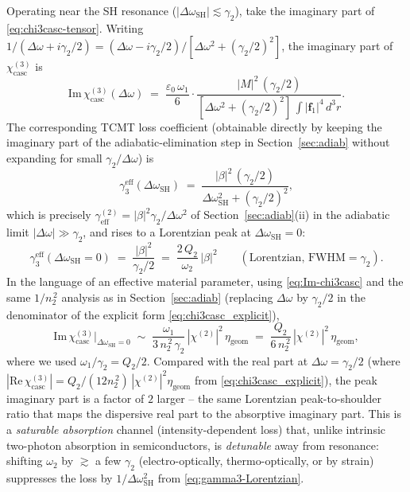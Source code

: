 \documentclass[11pt,a4paper]{article}
\newcommand{\eps}{\varepsilon}
\newcommand{\bvec}[1]{\mathbf{#1}}
\newcommand{\f}{\bvec{f}}
\newcommand{\dthreer}{\,d^{3}r}
\newcommand{\chitwo}{\chi^{(2)}}
\newcommand{\chithree}{\chi^{(3)}}
\newcommand{\Dom}{\Delta\omega}
\begin{document}
Operating near the SH resonance ($|\Dom_\text{SH}|\lesssim\gamma_2$),
take the imaginary part of \eqref{eq:chi3casc-tensor}.  Writing
$1/(\Dom+i\gamma_2/2)=(\Dom-i\gamma_2/2)/[\Dom^{2}+(\gamma_2/2)^{2}]$,
the imaginary part of $\chithree_\text{casc}$ is
\begin{equation}
  \mathrm{Im}\,\chithree_\text{casc}(\Dom)
   \;=\;\frac{\eps_0\,\omega_1}{6}\cdot
        \frac{|M|^{2}\,(\gamma_2/2)}{[\Dom^{2}+(\gamma_2/2)^{2}]\,\int|\f_1|^{4}\dthreer}.
  \label{eq:Im-chi3casc}
\end{equation}
The corresponding TCMT loss coefficient (obtainable directly by
keeping the imaginary part of the adiabatic-elimination step in
Section~\ref{sec:adiab} without expanding for small $\gamma_2/\Dom$)
is
\begin{equation}
  \gamma_3^\text{eff}(\Dom_\text{SH})
   \;=\;\frac{|\beta|^{2}\,(\gamma_2/2)}{\Dom_\text{SH}^{2}+(\gamma_2/2)^{2}},
  \label{eq:gamma3-Lorentzian}
\end{equation}
which is precisely $\gamma_\text{eff}^{(2)}=|\beta|^{2}\gamma_2/\Dom^{2}$
of Section~\ref{sec:adiab}(ii) in the adiabatic limit $|\Dom|\gg\gamma_2$,
and rises to a Lorentzian peak at $\Dom_\text{SH}=0$:
\begin{equation}
  \gamma_3^\text{eff}(\Dom_\text{SH}=0)\;=\;\frac{|\beta|^{2}}{\gamma_2/2}
  \;=\;\frac{2\,Q_2}{\omega_2}\,|\beta|^{2}
  \qquad(\text{Lorentzian, FWHM}=\gamma_2).
  \label{eq:gamma3-peak}
\end{equation}
In the language of an effective material parameter, using
\eqref{eq:Im-chi3casc} and the same $1/n_2^{\,2}$ analysis as in
Section~\ref{sec:adiab} (replacing $\Dom$ by $\gamma_2/2$ in the
denominator of the explicit form \eqref{eq:chi3casc_explicit}),
\begin{equation}
  \mathrm{Im}\,\chithree_\text{casc}\big|_{\Dom_\text{SH}=0}
       \;\sim\;\frac{\omega_1}{3\,n_2^{\,2}\,\gamma_2}\,|\chitwo|^{2}\,\eta_\text{geom}
       \;=\;\frac{Q_2}{6\,n_2^{\,2}}\,|\chitwo|^{2}\,\eta_\text{geom},
  \label{eq:Im-chi3-explicit}
\end{equation}
where we used $\omega_1/\gamma_2 = Q_2/2$.  Compared with the real
part at $\Dom=\gamma_2/2$ (where $|\mathrm{Re}\,\chithree_\text{casc}|
=Q_2/(12 n_2^{\,2})\,|\chitwo|^{2}\eta_\text{geom}$ from
\eqref{eq:chi3casc_explicit}), the peak imaginary part is a factor of
$2$ larger -- the same Lorentzian peak-to-shoulder ratio that maps the
dispersive real part to the absorptive imaginary part.
This is a \emph{saturable absorption} channel (intensity-dependent
loss) that, unlike intrinsic two-photon absorption in semiconductors,
is \emph{detunable} away from resonance: shifting $\omega_2$ by
$\gtrsim$ a few $\gamma_2$ (electro-optically, thermo-optically, or
by strain) suppresses the loss by $1/\Dom_\text{SH}^{2}$ from
\eqref{eq:gamma3-Lorentzian}.
\end{document}
